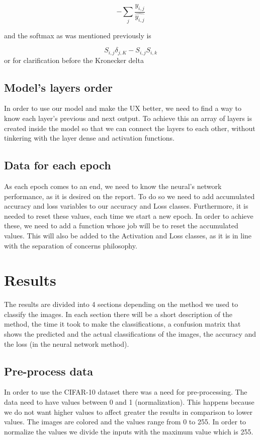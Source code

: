 \documentclass{article}
\begin{document}
\begin{equation}
    -\sum_j \frac{y_{i,j}}{\hat{y_{i,j}}}
\end{equation}

and the softmax as was mentioned previously is 

   \begin{equation}
S_{i,j} \delta_{j,K}  - S_{i,j} S_{i,k}
\end{equation} 
or for clarification before the Kronecker delta 


\subsection{Model's layers order}

In order to use our model and make the UX better, we need to find a way to know each layer's previous and next output. To achieve this an array of layers is created inside the model so that we can connect the layers to each other, without tinkering with the layer dense and activation functions. 

\subsection{Data for each epoch}
As each epoch comes to an end, we need to know the neural's network performance, as it is desired on the report. To do so we need to add accumulated accuracy and loss variables to our accuracy and Loss classes. Furthermore, it is needed to reset these values, each time we start a new epoch. In order to achieve these, we need to add a function whose job will be to reset the accumulated values. This will also be added to the Activation and Loss classes, as it is in line with the separation of concerns philosophy.   
\pagebreak

\section{Results}

The results are divided into 4 sections depending on the method we used to classify the images. In each section there will be a short description of the method, the time it took to make the classifications, a confusion matrix that shows the predicted and the actual classifications of the images, the accuracy and the loss (in the neural network method). 

\subsection{Pre-process data}
In order to use the CIFAR-10 dataset there was a need for pre-processing. The data need to have values between 0 and 1 (normalization). This happens because we do not want higher values to affect greater the results in comparison to lower values. The images are colored and the values range from 0 to 255. In order to normalize the values we divide the inputs with the maximum value which is 255. 
\end{document}
